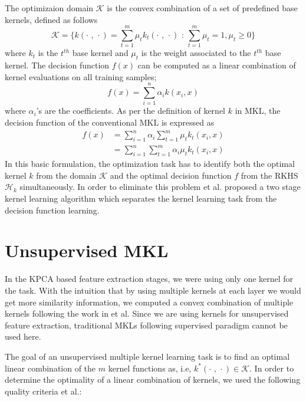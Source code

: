 The optimizaion domain $\mathcal{K}$ is the convex combination of a set of predefined base kernels, defined as follows
\[ \mathcal{K} = \Bigg\{ k( \cdot \textrm{ , } \cdot ) = \sum_{t=1}^m \mu_t k_t(\cdot \textrm{ , } \cdot) \textrm{ : } \sum_{t=1}^m \mu_t = 1, \mu_t \geq 0 \Bigg\} \]
where $k_t$ is the $t^{th}$ base kernel and $\mu_t$ is the weight associated to the $t^{th}$ base kernel. The decision function $f(x)$ can be computed as a linear combination of kernel evaluations on all training samples;
\[ f(x) = \sum_{i=1}^n \alpha_i k(x_i, x) \]
where $\alpha_i$'s are the coefficients. As per the definition of kernel $k$ in MKL, the decision function of the conventional MKL is expressed as
\begin{equation*}
\begin{aligned}
f(x) &= \sum_{i=1}^n \alpha_i \sum_{t=1}^m \mu_t k_t(x_i, x) \\
&= \sum_{i=1}^n \sum_{t=1}^m \alpha_i \mu_t k_t(x_i, x)
\end{aligned}
\end{equation*}
In this basic formulation, the optimization task has to identify both the optimal kernel $k$ from the domain $\mathcal{K}$ and the optimal decision function $f$ from the RKHS $\mathcal{H}_k$ simultaneously. In order to eliminate this problem \cite{corinna} et al. proposed a two stage kernel learning algorithm which separates the kernel learning task from the decision function learning.


\section{Unsupervised MKL}
\label{sec_umkl}
In the KPCA based feature extraction stages, we were using only one kernel for the task. With the intuition that by using multiple kernels at each layer we would get more similarity information, we computed a convex combination of multiple kernels following the work in \cite{zhuang} et al. Since we are using kernels for unsupervised feature extraction, traditional MKLs following supervised paradigm cannot be used here.

The goal of an unsupervised multiple kernel learning task is to find an optimal linear combination of the $m$ kernel functions as, i.e, $k^*(\cdot \textrm{ , } \cdot) \in \mathcal{K}$. %
In order to determine the optimality of a linear combination of kernels, we used the following quality criteria\cite{zhuang} et al.:

